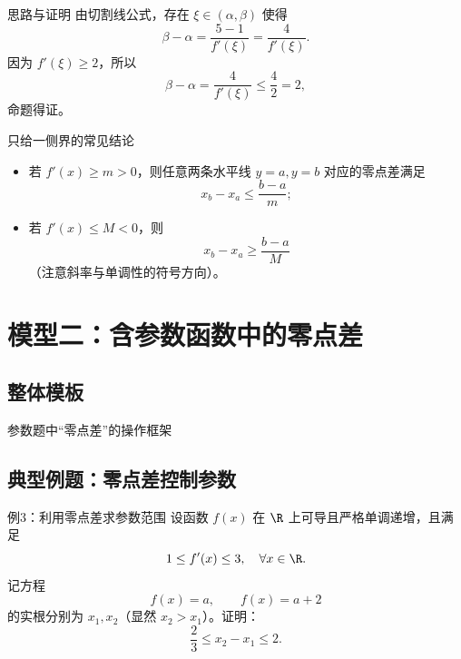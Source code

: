 \documentclass[a4paper,11pt]{ctexart}
\begin{document}
\begin{proofbox}{思路与证明}
由切割线公式，存在 $\xi\in(\alpha,\beta)$ 使得
\[
\beta-\alpha = \frac{5-1}{f'(\xi)} = \frac{4}{f'(\xi)}.
\]
因为 $f'(\xi)\geq 2$，所以
\[
\beta-\alpha = \frac{4}{f'(\xi)} \leq \frac{4}{2} = 2,
\]
命题得证。
\end{proofbox}

\begin{notebox}{只给一侧界的常见结论}
\begin{itemize}
  \item 若 $f'(x)\geq m>0$，则任意两条水平线 $y=a,y=b$ 对应的零点差满足
  \[
  x_b-x_a \leq \frac{b-a}{m};
  \]
  \item 若 $f'(x)\leq M<0$，则
  \[
  x_b-x_a \geq \frac{b-a}{M}
  \]
  （注意斜率与单调性的符号方向）。
\end{itemize}
\end{notebox}

\newpage

\section{模型二：含参数函数中的零点差}

\subsection{整体模板}

\begin{summarybox}{参数题中“零点差”的操作框架}
\begin{roadmap}
\end{roadmap}
\end{summarybox}

\subsection{典型例题：零点差控制参数}

\begin{examplebox}{例3：利用零点差求参数范围}
设函数 $f(x)$ 在 $\R$ 上可导且严格单调递增，且满足
\[
1 \leq f'(x) \leq 3,\quad \forall x\in\R.
\]
记方程
\[
f(x)=a,\qquad f(x)=a+2
\]
的实根分别为 $x_1,x_2$（显然 $x_2>x_1$）。证明：
\[
 \frac{2}{3} \leq x_2-x_1 \leq 2.
\]
\end{examplebox}
\end{document}
